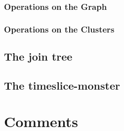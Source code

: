 \documentclass[12pt,a4paper]{report}
\begin{document}
\subsection{Operations on the Graph}


\subsection{Operations on the Clusters}



\section{The join tree}

\section{The timeslice-monster}


\newpage
\chapter{Comments}


\newpage

\end{document}
